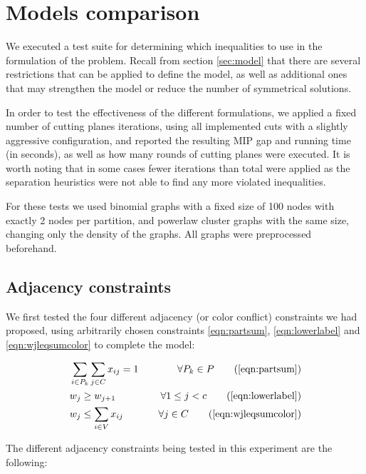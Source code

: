 
\section{Models comparison}

We executed a test suite for determining which inequalities to use in the formulation of the problem. Recall from section \ref{sec:model} that there are several restrictions that can be applied to define the model, as well as additional ones that may strengthen the model or reduce the number of symmetrical solutions.

In order to test the effectiveness of the different formulations, we applied a fixed number of cutting planes iterations, using all implemented cuts with a slightly aggressive configuration, and reported the resulting MIP gap and running time (in seconds), as well as how many rounds of cutting planes were executed. It is worth noting that in some cases fewer iterations than total were applied as the separation heuristics were not able to find any more violated inequalities.

For these tests we used binomial graphs with a fixed size of 100 nodes with exactly 2 nodes per partition, and powerlaw cluster graphs with the same size, changing only the density of the graphs. All graphs were preprocessed beforehand.

\subsection{Adjacency constraints}

We first tested the four different adjacency (or color conflict) constraints we had proposed, using arbitrarily chosen constraints \ref{eqn:partsum}, \ref{eqn:lowerlabel} and \ref{eqn:wjleqsumcolor} to complete the model:

\begin{align*}
&\sum_{i \in P_k} \sum_{j \in C} x_{ij} = 1 &\quad \forall P_k \in P \tag{\ref{eqn:partsum}} \\
&w_j \geq w_{j+1} &\quad \forall 1 \leq j < c \tag{\ref{eqn:lowerlabel}} \\
&w_j \leq \sum_{i \in V} x_{ij} &\quad \forall j \in C \tag{\ref{eqn:wjleqsumcolor}} \\
\end{align*}

The different adjacency constraints being tested in this experiment are the following: 


